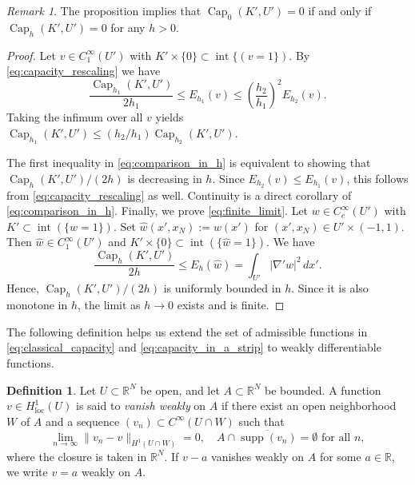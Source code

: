 \documentclass{article}
\numberwithin{equation}{section}
\theoremstyle{definition}
\newtheorem{definition}[theorem]{Definition}
\theoremstyle{remark}
\newtheorem{remark}{Remark}[theorem]
\newcommand{\cpct}{\operatorname{Cap}}
\newcommand{\supp}{\operatorname{supp}}
\newcommand{\topint}{\operatorname{int}}
\begin{document}
\begin{remark} \label{rmk:jointly_equal_to_zero}
    The proposition implies that $\cpct_0(K', U') = 0$ if and only if $\cpct_h(K', U') = 0$ for any $h > 0$.
\end{remark}

\begin{proof}
    Let $v \in C_1^\infty(U')$ with $K' \times \{0\} \subset \topint\{(v = 1\})$. By \eqref{eq:capacity_rescaling} we have
    \[
    \frac{\cpct_{h_1}(K', U')}{2h_1} \le E_{h_1}(v) \le \left(\frac{h_2}{h_1}\right)^2 E_{h_2}(v).
    \]
    Taking the infimum over all $v$ yields $\cpct_{h_1}(K', U') \le (h_2/h_1) \cpct_{h_2}(K', U')$. 
    
    The first inequality in \eqref{eq:comparison_in_h} is equivalent to showing that $\cpct_h(K', U')/(2h)$ is decreasing in $h$. Since $E_{h_2}(v) \le E_{h_1}(v)$, this follows from \eqref{eq:capacity_rescaling} as well. Continuity is a direct corollary of \eqref{eq:comparison_in_h}. Finally, we prove \eqref{eq:finite_limit}. Let $w \in C_c^\infty(U')$ with $K' \subset \topint(\{w = 1\})$. Set $\hat{w}(x', x_N) := w(x')$ for $(x', x_N) \in U' \times (-1, 1)$. Then $\hat{w} \in C_1^\infty(U')$ and $K' \times \{0\} \subset \topint(\{\hat{w} = 1\})$. We have
    \[
    \frac{\cpct_h(K', U')}{2h} \le E_h(\hat{w}) = \int_{U'} |\nabla' w|^2 \, dx'.
    \]
    Hence, $\cpct_h(K', U')/(2h)$ is uniformly bounded in $h$. Since it is also monotone in $h$, the limit as $h \to 0$ exists and is finite.
\end{proof}

The following definition helps us extend the set of admissible functions in \eqref{eq:classical_capacity} and \eqref{eq:capacity_in_a_strip} to weakly differentiable functions.
\begin{definition} \label{def:vanishing_weakly}
    Let $U \subset \mathbb{R}^N$ be open, and let $A \subset \mathbb{R}^N$ be bounded. A function $v \in H_\mathrm{loc}^1(U)$ is said to \textit{vanish weakly} on $A$ if there exist an open neighborhood $W$ of $A$ and a sequence $(v_n) \subset C^\infty(U \cap W)$ such that 
    \begin{equation} \label{eq:vanishing_weakly}
        \lim_{n \to \infty} \|v_n - v\|_{H^1(U \cap W)} = 0, \quad A \cap \overline{\supp (v_n)} = \emptyset \text{ for all } n,
    \end{equation}
    where the closure is taken in $\mathbb{R}^N$. If $v - a$ vanishes weakly on $A$ for some $a \in \mathbb{R}$, we write $v = a$ weakly on $A$.
\end{definition}
\end{document}
